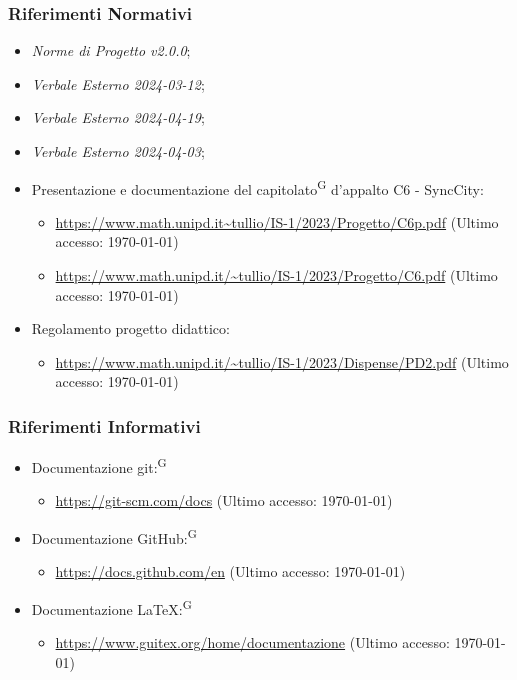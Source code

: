\documentclass[8pt]{article}
\newcommand{\glossterm}[1]{#1\textsuperscript{G}} %
\begin{document}
\subsubsection{Riferimenti Normativi}
\begin{itemize}
	\setlength\itemsep{0em}
	\item \textit{Norme di Progetto v2.0.0};
    \item \textit{Verbale Esterno 2024-03-12};
	\item \textit{Verbale Esterno 2024-04-19};
	\item \textit{Verbale Esterno 2024-04-03};
  \item Presentazione e documentazione del \glossterm{capitolato} d'appalto C6 - SyncCity:
	\begin{itemize}
		\item \href{https://www.math.unipd.it/~tullio/IS-1/2023/Progetto/C6p.pdf}{\color{myblue}https://www.math.unipd.it\textasciitilde{}tullio/IS-1/2023/Progetto/C6p.pdf} (Ultimo accesso: \today)
		\item \href{https://www.math.unipd.it/~tullio/IS-1/2023/Progetto/C6.pdf}{\color{myblue}https://www.math.unipd.it/\textasciitilde{}tullio/IS-1/2023/Progetto/C6.pdf} (Ultimo accesso: \today)
  \end{itemize}
  \item Regolamento progetto didattico:
      \begin{itemize}
          \item \href{https://www.math.unipd.it/~tullio/IS-1/2023/Dispense/PD2.pdf}{\color{myblue}https://www.math.unipd.it/\textasciitilde{}tullio/IS-1/2023/Dispense/PD2.pdf} (Ultimo accesso: \today)
    \end{itemize}
\end{itemize}
\subsubsection{Riferimenti Informativi}
\begin{itemize}
    \setlength\itemsep{0em}
    \item Documentazione \glossterm{git:} 
      \begin{itemize}
          \item \href{https://git-scm.com/docs}{\color{myblue}https://git-scm.com/docs} (Ultimo accesso: \today)
      \end{itemize}
    \item Documentazione \glossterm{GitHub:} 
      \begin{itemize}
          \item \href{https://docs.github.com/en}{\color{myblue}https://docs.github.com/en} (Ultimo accesso: \today)
      \end{itemize}
    \item Documentazione \glossterm{\LaTeX:} 
      \begin{itemize}
          \item \href{https://www.guitex.org/home/documentazione}{\color{myblue}https://www.guitex.org/home/documentazione} (Ultimo accesso: \today)
      \end{itemize}
\end{itemize}
\newpage
\end{document}

